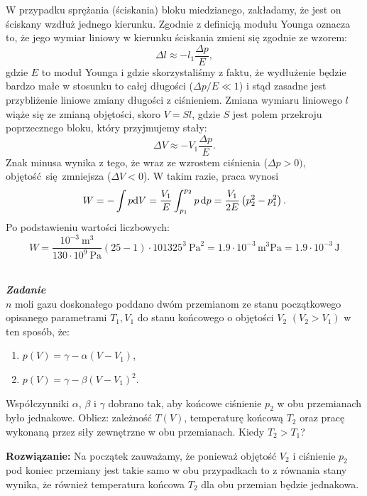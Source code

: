 \documentclass[11pt,a4paper]{article}
\newcounter{zadanie}\newcommand{\zadanie}[1][]{\addtocounter{zadanie}{1} ~\\  {\bf \emph{Zadanie \arabic{zadanie} #1 }} \\}
\renewcommand{\t}[1]{\textrm{#1}}
\begin{document}
W przypadku sprężania (ściskania) bloku miedzianego, zakładamy, że jest on ściskany wzdłuż jednego kierunku. Zgodnie z definicją modułu Younga oznacza to,  że jego wymiar liniowy w kierunku ściskania zmieni się zgodnie ze wzorem:
$$
\Delta l \approx -l_1 \frac{\Delta p}{E},
$$
gdzie $E$ to moduł Younga i gdzie skorzystaliśmy z faktu, że wydłużenie będzie bardzo małe w stosunku
to całej długości ($\Delta p /E \ll 1$) i stąd zasadne jest przybliżenie liniowe zmiany długości z ciśnieniem.
Zmiana wymiaru liniowego $l$ wiąże się ze zmianą objętości, skoro $V = S l$,
 gdzie $S$ jest polem przekroju poprzecznego bloku, który przyjmujemy stały:
$$
\Delta V \approx   - V_1 \frac{\Delta p}{E}.
$$
Znak minusa wynika z tego, że wraz ze wzrostem ciśnienia ($\Delta p > 0)$, objętość się zmniejsza ($\Delta V < 0$). 
W takim razie, praca wynosi
$$
W = - \int p {\rm d}V = \frac{V_1}{E} \int_{p_1}^{p_2} p\, {\rm d} p = 
\frac{V_1}{2E} \left(p_2^2 - p_1^2 \right).
$$
Po podstawieniu wartości liczbowych:
$$
W = \frac{10^{-3}~\t{m}^{3}}{130 \cdot 10^{9}~\t{Pa}}(25 - 1)\cdot 101325^{3}~\t{Pa}^{2} 
=  1.9 \cdot 10^{-3}\,\t{m}^{3}\t{Pa} =  1.9 \cdot 10^{-3}\,\t{J}
$$

\newpage
\zadanie
$n$ moli gazu doskonałego poddano dwóm przemianom ze stanu początkowego
opisanego parametrami $T_1, V_1$ do stanu końcowego o objętości $V_2$
$(V_2>V_1)$ w ten
sposób, że:\begin{enumerate}
\item $p(V) = \gamma - \alpha (V-V_1)$,
\item $p(V) = \gamma - \beta (V-V_1)^2$.
\end{enumerate}
Współczynniki $\alpha$, $\beta$ i $\gamma$ dobrano tak,
aby końcowe ciśnienie $p_2$ w obu przemianach było jednakowe.
Oblicz: zależność $T(V)$, temperaturę końcową $T_2$
oraz pracę wykonaną przez siły zewnętrzne w obu przemianach.
Kiedy $T_2>T_1$?

\vskip 10pt
\textbf{Rozwiązanie:}
Na początek zauważamy, że ponieważ objętość $V_2$ i ciśnienie $p_2$ pod koniec przemiany jest takie samo w obu przypadkach to z równania stany wynika, że również temperatura
końcowa $T_2$ dla obu przemian będzie jednakowa.
\end{document}
